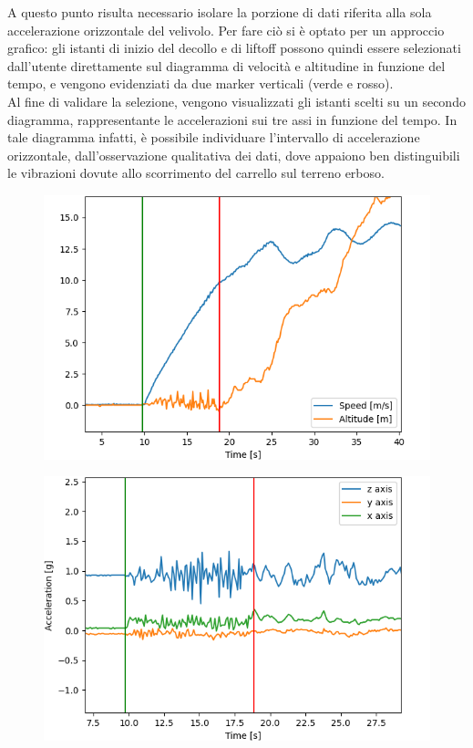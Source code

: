 \documentclass[12pt]{article}
\begin{document}
A questo punto risulta necessario isolare la porzione di dati riferita alla sola accelerazione orizzontale del velivolo. Per fare ciò si è optato per un approccio grafico: gli istanti di inizio del decollo e di liftoff possono quindi essere selezionati dall'utente direttamente sul diagramma di velocità e altitudine in funzione del tempo, e vengono evidenziati da due marker verticali (verde e rosso).\\
Al fine di validare la selezione, vengono visualizzati gli istanti scelti su un secondo diagramma, rappresentante le accelerazioni sui tre assi in funzione del tempo. In tale diagramma infatti, è possibile individuare l'intervallo di accelerazione orizzontale, dall'osservazione qualitativa dei dati, dove appaiono ben distinguibili le vibrazioni dovute allo scorrimento del carrello sul terreno erboso.

\newpage
\begin{figure}[H]
	\centering
	\includegraphics[width=13cm]{img/select-to-1}
\end{figure}

\begin{figure}[H]
	\centering
	\includegraphics[width=13cm]{img/select-to-2}
\end{figure}

\newpage


\end{document}
